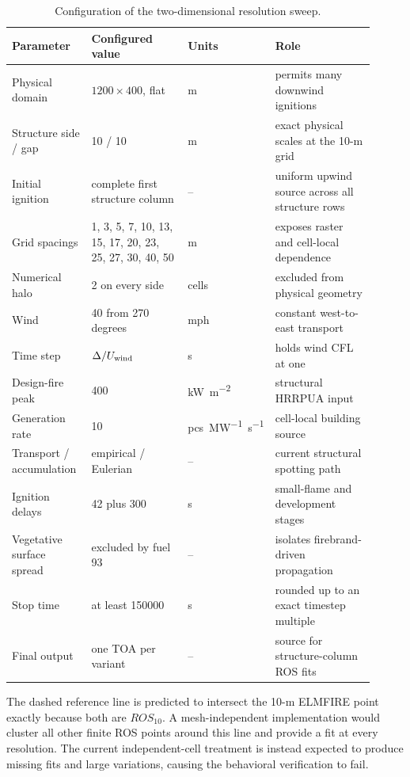 \begin{table}[H]
\centering\footnotesize
\caption{Configuration of the two-dimensional resolution sweep.}
\begin{tabular}{@{}p{0.22\linewidth}p{0.27\linewidth}p{0.13\linewidth}p{0.29\linewidth}@{}}
\toprule
Parameter & Configured value & Units & Role\\
\midrule
Physical domain & \(1200\times400\), flat & m & permits many downwind ignitions\\
Structure side / gap & 10 / 10 & m & exact physical scales at the 10-m grid\\
Initial ignition & complete first structure column & -- & uniform upwind source across all structure rows\\
Grid spacings & 1, 3, 5, 7, 10, 13, 15, 17, 20, 23, 25, 27, 30, 40, 50 & m & exposes raster and cell-local dependence\\
Numerical halo & 2 on every side & cells & excluded from physical geometry\\
Wind & 40 from 270 degrees & mph & constant west-to-east transport\\
Time step & \(\Delta/U_{\rm wind}\) & s & holds wind CFL at one\\
Design-fire peak & 400 & \si{kW.m^{-2}} & structural HRRPUA input\\
Generation rate & 10 & \si{pcs.MW^{-1}.s^{-1}} & cell-local building source\\
Transport / accumulation & empirical / Eulerian & -- & current structural spotting path\\
Ignition delays & 42 plus 300 & s & small-flame and development stages\\
Vegetative surface spread & excluded by fuel 93 & -- & isolates firebrand-driven propagation\\
Stop time & at least 150000 & s & rounded up to an exact timestep multiple\\
Final output & one TOA per variant & -- & source for structure-column ROS fits\\
\bottomrule
\end{tabular}
\end{table}

The dashed reference line is predicted to intersect the 10-m ELMFIRE point
exactly because both are \(ROS_{10}\). A mesh-independent implementation would
cluster all other finite ROS points around this line and provide a fit at every
resolution. The current independent-cell treatment is instead expected to
produce missing fits and large variations, causing the behavioral verification
to fail.

